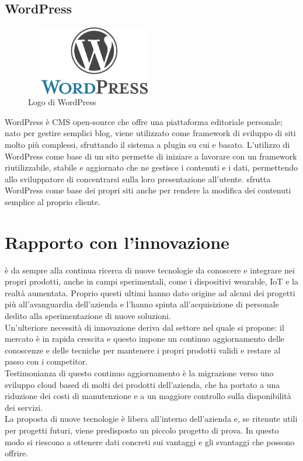    \subsection{WordPress}
   \begin{figure}[H]
      \begin{center}
         \includegraphics[width=6cm,height=3cm,keepaspectratio]{immagini/wordpress-logo}
      \end{center}
      \caption{Logo di WordPress}\label{logowordpress}
   \end{figure}
   WordPress è \gls{CMS} open-source che offre una piattaforma editoriale personale; nato per gestire semplici blog, viene utilizzato come framework di sviluppo di siti molto più complessi, sfruttando il sistema a plugin su cui e basato. L'utilizzo di WordPress come base di un sito permette di iniziare a lavorare con un framework riutilizzabile, stabile e aggiornato che ne gestisce i contenuti e i dati, permettendo allo sviluppatore di concentrarsi sulla loro presentazione all'utente.
   \nomeAzienda{} sfrutta WordPress come base dei propri siti anche per rendere la modifica dei contenuti semplice al proprio cliente.

\section{Rapporto con l'innovazione}
\nomeAzienda{} è da sempre alla continua ricerca di nuove tecnologie da conoscere e integrare nei propri prodotti, anche in campi sperimentali, come i dispositivi \gls{wearable}, \gls{IoT} e la realtà aumentata. Proprio questi ultimi hanno dato origine ad alcuni dei progetti più all'avanguardia dell'azienda e l'hanno spinta all'acquisizione di personale dedito alla sperimentazione di nuove soluzioni.
\\
Un'ulteriore necessità di innovazione deriva dal settore nel quale \nomeAzienda{} si propone: il mercato è in rapida crescita e questo impone un continuo aggiornamento delle conoscenze e delle tecniche per mantenere i propri prodotti validi e restare al passo con i competitor.
\\
Testimonianza di questo continuo aggiornamento è la migrazione verso uno sviluppo cloud based di molti dei prodotti dell'azienda, che ha portato a una riduzione dei costi di manutenzione e a un maggiore controllo sulla disponibilità dei servizi.
\\
La proposta di nuove tecnologie è libera all'interno dell'azienda e, se ritenute utili per progetti futuri, viene predisposto un piccolo progetto di prova. In questo modo si riescono a ottenere dati concreti sui vantaggi e gli svantaggi che possono offrire.
